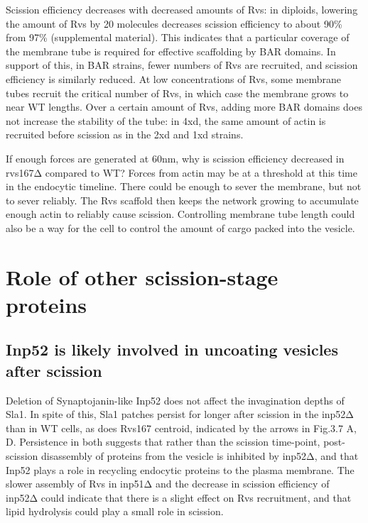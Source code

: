 Scission efficiency decreases with decreased amounts of Rvs: in diploids, lowering the amount of Rvs by 20 molecules decreases scission efficiency to about 90\% from 97\% (supplemental material). This indicates that a particular coverage of the membrane tube is required for effective scaffolding by BAR domains. In support of this, in BAR strains, fewer numbers of Rvs are recruited, and scission efficiency is similarly reduced. At low concentrations of Rvs, some membrane tubes recruit the critical number of Rvs, in which case the membrane grows to near WT lengths. Over a certain amount of Rvs, adding more BAR domains does not increase the stability of the tube: in 4xd, the same amount of actin is recruited before scission as in the 2xd and 1xd strains. 

	\vspace{5mm}
If enough forces are generated at 60nm, why is scission efficiency decreased in rvs167Δ compared to WT? 
Forces from actin may be at a threshold at this time in the endocytic timeline. There could be enough to sever the membrane, but not to sever reliably. The Rvs scaffold then keeps the network growing to accumulate enough actin to reliably cause scission. Controlling membrane tube length could also be a way for the cell to control the amount of cargo packed into the vesicle. 





\section{Role of other scission-stage proteins}
\subsection{Inp52 is likely involved in uncoating vesicles after scission}
Deletion of Synaptojanin-like Inp52 does not affect the invagination depths of Sla1. In spite of this, Sla1 patches persist for longer after scission in the inp52Δ than in WT cells, as does Rvs167 centroid, indicated by the arrows in Fig.3.7 A, D. Persistence in both suggests that rather than the scission time-point, post- scission disassembly of proteins from the vesicle is inhibited by inp52Δ, and that Inp52 plays a role in recycling endocytic proteins to the plasma membrane. The slower assembly of Rvs in inp51Δ and the decrease in scission efficiency of inp52Δ could indicate that there is a slight effect on Rvs recruitment, and that lipid hydrolysis could play a small role in scission. 


